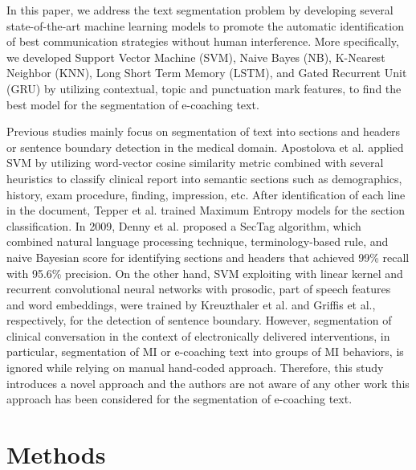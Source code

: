 \documentclass{amia}
\begin{document}
In this paper, we address the text segmentation problem by developing several state-of-the-art machine learning models to promote the automatic identification of best communication strategies without human interference. More specifically, we developed Support Vector Machine (SVM), Naive Bayes (NB), K-Nearest Neighbor (KNN), Long Short Term Memory (LSTM), and Gated Recurrent Unit (GRU) by utilizing contextual, topic and punctuation mark features, to find the best model for the segmentation of e-coaching text. 

Previous studies mainly focus on segmentation of text into sections and headers\cite{apostolova2009automatic,denny2009evaluation,tepper2012statistical,cho2002text} or sentence boundary detection\cite{griffis2016quantitative,kreuzthaler2015detection,treviso2016sentence} in the medical domain. Apostolova et al.\cite{apostolova2009automatic} applied SVM by utilizing word-vector cosine similarity metric combined with several heuristics to classify clinical report into semantic sections such as demographics, history, exam procedure, finding, impression, etc. After identification of each line in the document, Tepper et al. \cite{tepper2012statistical} trained Maximum Entropy models for the section classification. In 2009, Denny et al.\cite{denny2009evaluation} proposed a SecTag algorithm, which combined natural language processing technique, terminology-based rule, and naive Bayesian score for identifying sections and headers that achieved 99\% recall with 95.6\% precision. On the other hand, SVM exploiting with linear kernel and recurrent convolutional neural networks with prosodic, part of speech features and word embeddings, were trained by Kreuzthaler et al.\cite{kreuzthaler2015detection} and Griffis et al.\cite{griffis2016quantitative}, respectively, for the detection of sentence boundary. However, segmentation of clinical conversation in the context of electronically delivered interventions, in particular, segmentation of MI or e-coaching text into groups of MI behaviors, is ignored while relying on manual hand-coded approach. Therefore, this study introduces a novel approach and the authors are not aware of any other work this approach has been considered for the segmentation of e-coaching text.  

\section*{Methods}
\end{document}
